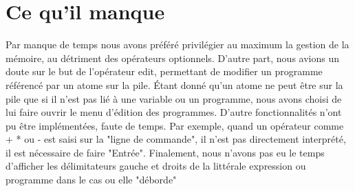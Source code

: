 \section{Ce qu'il manque}
Par manque de temps nous avons préféré privilégier au maximum la gestion de la mémoire, au détriment des opérateurs optionnels. D'autre part, nous avions un doute sur le but de l'opérateur edit, permettant de modifier un programme référencé par un atome sur la pile. Étant donné qu'un atome ne peut être sur la pile que si il n'est pas lié à une variable ou un programme, nous avons choisi de lui faire ouvrir le menu d'édition des programmes.
\medskip
D'autre fonctionnalités n'ont pu être implémentées, faute de temps. Par exemple, quand un opérateur comme + * ou - est saisi sur la "ligne de commande", il n'est pas directement interprété, il est nécessaire de faire "Entrée". Finalement, nous n'avons pas eu le temps d'afficher les délimitateurs gauche et droits de la littérale expression ou programme dans le cas ou elle "déborde"
